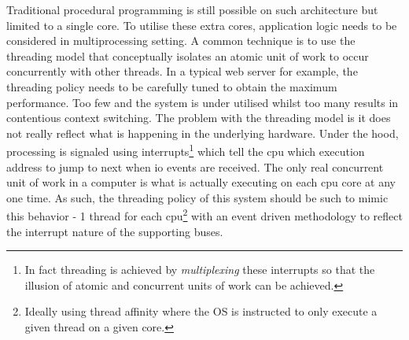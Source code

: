 \documentclass[a4paper,11pt]{scrreprt}
\begin{document}
Traditional procedural programming is still possible on such architecture but limited to a single core. To utilise these extra cores, application logic needs to be considered in multiprocessing setting. A common technique is to use the threading model that conceptually isolates an atomic unit of work to occur concurrently with other threads. In a typical web server for example, the threading policy needs to be carefully tuned to obtain the maximum performance. Too few and the system is under utilised whilst too many results in contentious context switching. The problem with the threading model is it does not really reflect what is happening in the underlying hardware. Under the hood, processing is signaled using interrupts\footnote{In fact threading is achieved by \textit{multiplexing} these interrupts so that the illusion of atomic and concurrent units of work can be achieved.} which tell the \acrshort{cpu} which execution address to jump to next when \acrshort{io} events are received. The only real concurrent unit of work in a computer is what is actually executing on each \acrshort{cpu} core at any one time. As such, the threading policy of this system should be such to mimic this behavior - 1 thread for each \acrshort{cpu}\footnote{Ideally using thread affinity where the OS is instructed to only execute a given thread on a given core.} with an event driven methodology to reflect the interrupt nature of the supporting buses.
\end{document}
